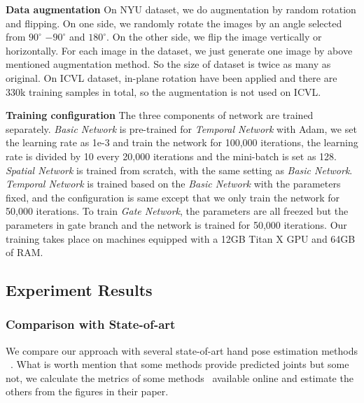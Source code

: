 \documentclass[journal,comsoc]{IEEEtran}
\begin{document}
\textbf{Data augmentation}
On NYU dataset, we do augmentation by random rotation and flipping. On one side, we randomly rotate the images 
by an angle selected from $90^\circ$ $-90^{\circ}$ and $180^{\circ}$. On the other side, we flip the image 
vertically or horizontally. For each image in the dataset, we just generate one image by above mentioned augmentation 
method. So the size of dataset is twice as many as original. On ICVL dataset, in-plane rotation have been applied and 
there are 330k training samples in total, so the augmentation is not used on ICVL.

\textbf{Training configuration}
The three components of network are trained separately. \emph{Basic Network} is pre-trained for
\emph{Temporal Network} with Adam, we set the learning rate as 1e-3
and train the network for 100,000 iterations, the learning rate is divided by 10 every 20,000
iterations and the mini-batch is set as 128. \emph{Spatial Network} is trained from scratch,
with the same setting as \emph{Basic Network}. \emph{Temporal Network} is trained based on the \emph{Basic Network}
with the parameters fixed, and the configuration is same except that we only train the
network for 50,000 iterations.  To train \emph{Gate Network}, the parameters are all freezed
but the parameters in gate branch and the network is trained for 50,000 iterations. Our training
takes place on machines equipped with a 12GB Titan X GPU and 64GB of RAM.

\subsection{Experiment Results}\label{sec:experiment results}
\subsubsection{Comparison with State-of-art}\label{sec:comparison}
We compare our approach with several state-of-art hand pose estimation methods
~\cite{tompson2014real,wan2017crossing,oberweger2015hands,oberweger2015training,
zhou2016model,tang2014latent,ge2017_3D,sinha2016deephand}. What is worth mention
that some methods provide predicted joints but some not, we calculate the metrics
of some methods~\cite{tompson2014real,oberweger2015hands,oberweger2015training,
zhou2016model,tang2014latent} available online and estimate the others from the
figures in their paper.
\end{document}
